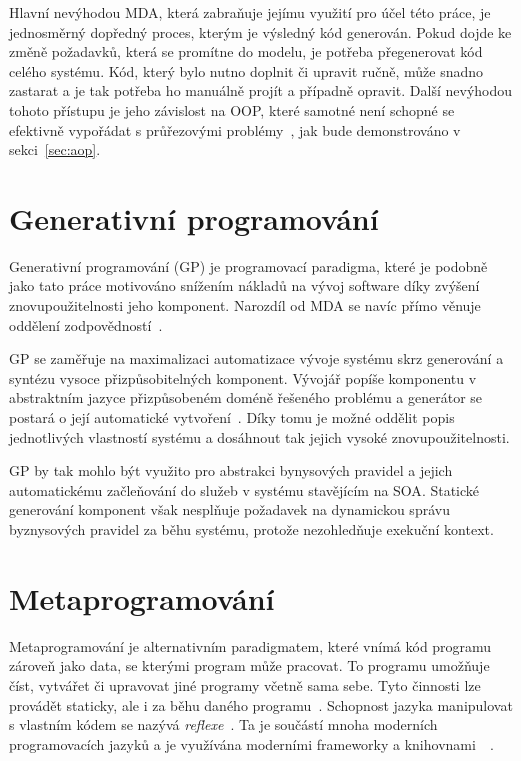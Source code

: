 Hlavní nevýhodou \gls{MDA}, která zabraňuje jejímu využití pro účel této práce,
je jednosměrný dopředný proces, kterým je výsledný kód generován.
Pokud dojde ke změně požadavků, která se promítne do modelu, je potřeba přegenerovat
kód celého systému. Kód, který bylo nutno doplnit či upravit ručně, může snadno zastarat a je tak
potřeba ho manuálně projít a případně opravit. Další nevýhodou tohoto přístupu je jeho závislost na \gls{OOP},
které samotné není schopné se efektivně vypořádat s průřezovými problémy~\cite{kennard2009separation}\cite{cemus2014aspect},
jak bude demonstrováno v sekci~\ref{sec:aop}.

\section{Generativní programování}

Generativní programování (\gls{GP}) je programovací paradigma, které je podobně jako
tato práce motivováno snížením nákladů na vývoj software díky zvýšení znovupoužitelnosti
jeho komponent. Narozdíl od \gls{MDA} se navíc přímo věnuje oddělení zodpovědností~\cite{czarnecki2000generative}\cite{cemus2017separation}.

\gls{GP} se zaměřuje na maximalizaci automatizace vývoje systému
skrz generování a syntézu vysoce přizpůsobitelných komponent. Vývojář
popíše komponentu v abstraktním jazyce přizpůsobeném doméně řešeného
problému a generátor se postará o její automatické vytvoření~\cite{czarnecki2000generative}.
Díky tomu je možné oddělit popis jednotlivých vlastností systému a dosáhnout tak
jejich vysoké znovupoužitelnosti.

\gls{GP} by tak mohlo být využito pro abstrakci bynysových pravidel a jejich
automatickému začleňování do služeb v systému stavějícím na \gls{SOA}.
Statické generování komponent však nesplňuje požadavek na dynamickou správu
byznysových pravidel za běhu systému, protože nezohledňuje exekuční kontext.

\section{Metaprogramování}

Metaprogramování je alternativním paradigmatem, které vnímá kód programu
zároveň jako data, se kterými program může pracovat. To programu umožňuje
číst, vytvářet či upravovat jiné programy včetně sama sebe. Tyto činnosti
lze provádět staticky, ale i za běhu daného programu~\cite{sheard2001accomplishments}\cite{czarnecki2000generative}.
Schopnost jazyka manipulovat s vlastním kódem se nazývá \textit{reflexe}~\cite{sobel1996introduction}.
Ta je součástí mnoha moderních programovacích jazyků a je využívána moderními frameworky a
knihovnami~\cite{vandevoorde2002c++}~\cite{forman2004java}.

